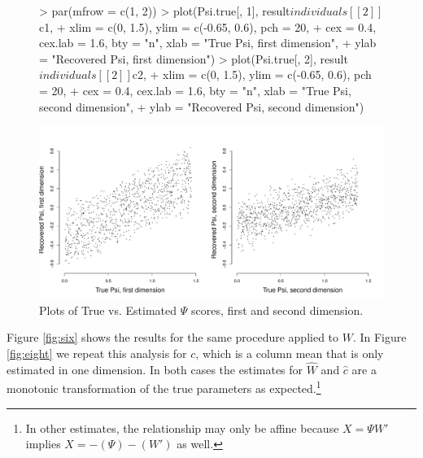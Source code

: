 \documentclass[nojss]{jss}
\begin{document}
\begin{figure}
\begin{center}
\begin{Schunk}
\begin{Sinput}
> par(mfrow = c(1, 2))
> plot(Psi.true[, 1], result$individuals[[2]]$c1, 
+     xlim = c(0, 1.5), ylim = c(-0.65, 0.6), pch = 20, 
+     cex = 0.4, cex.lab = 1.6, bty = "n", xlab = "True Psi, first dimension", 
+     ylab = "Recovered Psi, first dimension")
> plot(Psi.true[, 2], result$individuals[[2]]$c2, 
+     xlim = c(0, 1.5), ylim = c(-0.65, 0.6), pch = 20, 
+     cex = 0.4, cex.lab = 1.6, bty = "n", xlab = "True Psi, second dimension", 
+     ylab = "Recovered Psi, second dimension")
\end{Sinput}
\end{Schunk}
\includegraphics{basicspace-seven}
\end{center}
\caption{Plots of True vs. Estimated $\Psi$ scores, first and second dimension.}
\label{fig:seven}
\end{figure}

Figure \ref{fig:six} shows the results for the same procedure applied to $W$. In Figure
\ref{fig:eight} we repeat this analysis for $c$, which is a column mean that is only estimated in
one dimension.  In both cases the estimates for $\hat{W}$ and $\hat{c}$ are a monotonic transformation of the
true parameters as expected.\footnote{In other estimates, the relationship may only be affine because $X = \Psi W'$
implies $X = -(\Psi) -(W')$ as well.}
\end{document}
